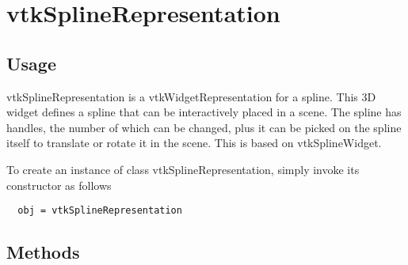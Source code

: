 \section{vtkSplineRepresentation}

\subsection{Usage}

 vtkSplineRepresentation is a vtkWidgetRepresentation for a spline.
 This 3D widget defines a spline that can be interactively placed in a
 scene. The spline has handles, the number of which can be changed, plus it
 can be picked on the spline itself to translate or rotate it in the scene.
 This is based on vtkSplineWidget.

To create an instance of class vtkSplineRepresentation, simply
invoke its constructor as follows
\begin{verbatim}
  obj = vtkSplineRepresentation
\end{verbatim}
\subsection{Methods}

